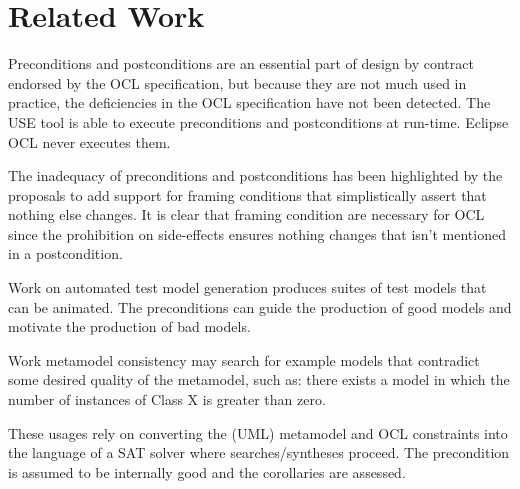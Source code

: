 \documentclass{llncs}
\begin{document}

\section{Related Work}\label{Related Work}

Preconditions and postconditions are an essential part of design by contract endorsed by the OCL specification, but because they are not much used in practice, the deficiencies in the OCL specification have not been detected. The USE tool is able to execute preconditions and postconditions at run-time. Eclipse OCL never executes them.

The inadequacy of preconditions and postconditions has been highlighted by the proposals to add support for framing conditions that simplistically assert that nothing else changes. It is clear that framing condition are necessary for OCL since the prohibition on side-effects ensures nothing changes that isn't mentioned in a postcondition.  

Work on automated test model generation produces suites of test models that can be animated. The preconditions can guide the production of good models and motivate the production of bad models.

Work metamodel consistency may search for example models that contradict some desired quality of the metamodel, such as: there exists a model in which the number of instances of Class X is greater than zero.

These usages rely on converting the (UML) metamodel and OCL constraints into the language of a SAT solver where searches/syntheses proceed. The precondition is assumed to be internally good and the corollaries are assessed.
\end{document}
